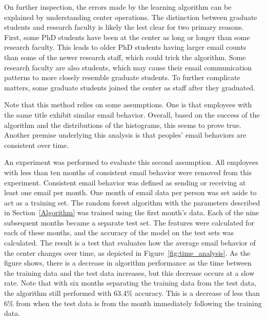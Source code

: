 \documentclass[12pt]{report}
\begin{document}
On further inspection, the errors made by the learning algorithm can be explained by understanding center operations.
The distinction between graduate students and research faculty is likely the lest clear for two primary reasons.
First, some PhD students have been at the center as long or longer than some research faculty.
This leads to older PhD students having larger email counts than some of the newer research staff, which could trick the algorithm.
Some research faculty are also students, which may cause their email communication patterns to more closely resemble graduate students. 
To further complicate matters, some graduate students joined the center as staff after they graduated.


Note that this method relies on some assumptions.
One is that employees with the same title exhibit similar email behavior.
Overall, based on the success of the algorithm and the distributions of the histograms, this seems to prove true.
Another premise underlying this analysis is that peoples' email behaviors are consistent over time.

An experiment was performed to evaluate this second assumption.
All employees with less than ten months of consistent email behavior were removed from this experiment.
Consistent email behavior was defined as sending or receiving at least one email per month.
One month of email data per person was set aside to act as a training set.
The random forest algorithm with the parameters described in Section~\ref{Algorithm} was trained using the first month's data.
Each of the nine subsequent months became a separate test set.
The features were calculated for each of these months, and the accuracy of the model on the test sets was calculated.
The result is a test that evaluates how the average email behavior of the center changes over time, as depicted in Figure~\ref{fig:time_analysis}.
As the figure shows, there is a decrease in algorithm performance as the time between the training data and the test data increases, but this decrease occurs at a slow rate.
Note that with six months separating the training data from the test data, the algorithm still performed with 63.4\% accuracy.
This is a decrease of less than 6\% from when the test data is from the month immediately following the training data.
\end{document}
